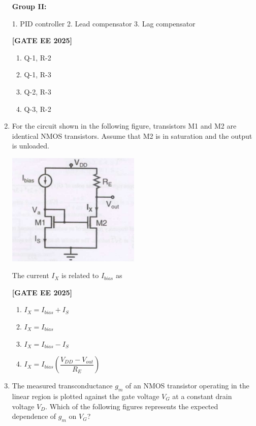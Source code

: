 \documentclass[12pt]{article}
\begin{document}
\begin{enumerate}[leftmargin=*, label=\textbf{Q.\arabic*:}]
\textbf{Group II:}

1. PID controller\hspace{1em}
2. Lead compensator\hspace{1em}
3. Lag compensator
 
\noindent \textbf{[GATE EE 2025]}
\begin{enumerate}[label=(\Alph*)]
  \item Q-1, R-2
  \item Q-1, R-3
  \item Q-2, R-3
  \item Q-3, R-2
\end{enumerate}

\item For the circuit shown in the following figure, transistors M1 and M2 are identical NMOS transistors. Assume that M2 is in saturation and the output is unloaded.
\begin{center}
\includegraphics[width=0.5\textwidth]{figs/q44.png}
\end{center}

The current $I_X$ is related to $I_{bias}$ as
 
\noindent \textbf{[GATE EE 2025]}
\begin{enumerate}[label=(\Alph*)]
  \item $I_X = I_{bias} + I_S$
  \item $I_X = I_{bias}$
  \item $I_X = I_{bias} - I_S$
  \item $I_X = I_{bias}\left( \dfrac{V_{DD} - V_{out}}{R_E} \right)$
\end{enumerate}

\item The measured transconductance $g_m$ of an NMOS transistor operating in the linear region is plotted against the gate voltage $V_G$ at a constant drain voltage $V_D$. Which of the following figures represents the expected dependence of $g_m$ on $V_G$?
 

\end{enumerate}
\end{document}
